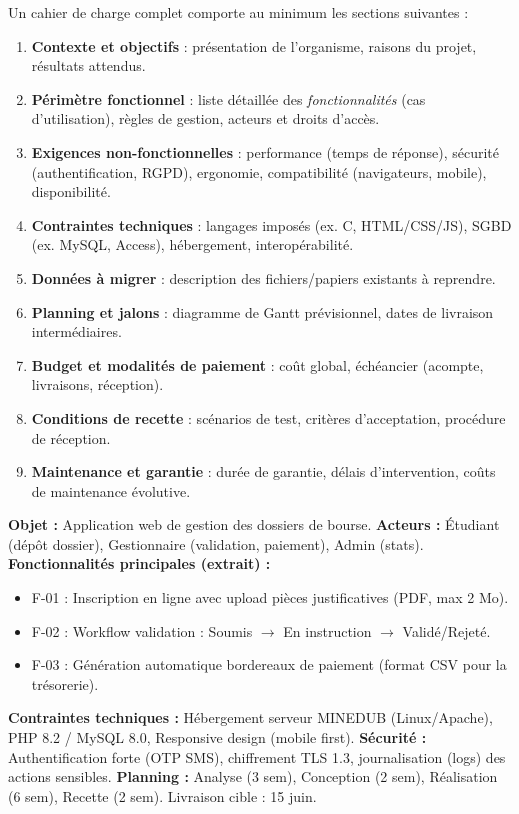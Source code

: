 \documentclass[11pt]{article}
\begin{document}
\begin{propriete}
Un cahier de charge complet comporte au minimum les sections suivantes :
\begin{enumerate}
\item \textbf{Contexte et objectifs} : présentation de l'organisme, raisons du projet, résultats attendus.
\item \textbf{Périmètre fonctionnel} : liste détaillée des \emph{fonctionnalités} (cas d'utilisation), règles de gestion, acteurs et droits d'accès.
\item \textbf{Exigences non-fonctionnelles} : performance (temps de réponse), sécurité (authentification, RGPD), ergonomie, compatibilité (navigateurs, mobile), disponibilité.
\item \textbf{Contraintes techniques} : langages imposés (ex. C, HTML/CSS/JS), SGBD (ex. MySQL, Access), hébergement, interopérabilité.
\item \textbf{Données à migrer} : description des fichiers/papiers existants à reprendre.
\item \textbf{Planning et jalons} : diagramme de Gantt prévisionnel, dates de livraison intermédiaires.
\item \textbf{Budget et modalités de paiement} : coût global, échéancier (acompte, livraisons, réception).
\item \textbf{Conditions de recette} : scénarios de test, critères d'acceptation, procédure de réception.
\item \textbf{Maintenance et garantie} : durée de garantie, délais d'intervention, coûts de maintenance évolutive.
\end{enumerate}
\end{propriete}

\begin{exemplebox}
\textbf{Objet :} Application web de gestion des dossiers de bourse.
\textbf{Acteurs :} Étudiant (dépôt dossier), Gestionnaire (validation, paiement), Admin (stats).
\textbf{Fonctionnalités principales (extrait) :}
\begin{itemize}
\item F-01 : Inscription en ligne avec upload pièces justificatives (PDF, max 2 Mo).
\item F-02 : Workflow validation : Soumis $\rightarrow$ En instruction $\rightarrow$ Validé/Rejeté.
\item F-03 : Génération automatique bordereaux de paiement (format CSV pour la trésorerie).
\end{itemize}
\textbf{Contraintes techniques :} Hébergement serveur MINEDUB (Linux/Apache), PHP 8.2 / MySQL 8.0, Responsive design (mobile first).
\textbf{Sécurité :} Authentification forte (OTP SMS), chiffrement TLS 1.3, journalisation (logs) des actions sensibles.
\textbf{Planning :} Analyse (3 sem), Conception (2 sem), Réalisation (6 sem), Recette (2 sem). Livraison cible : 15 juin.
\end{exemplebox}
\end{document}
